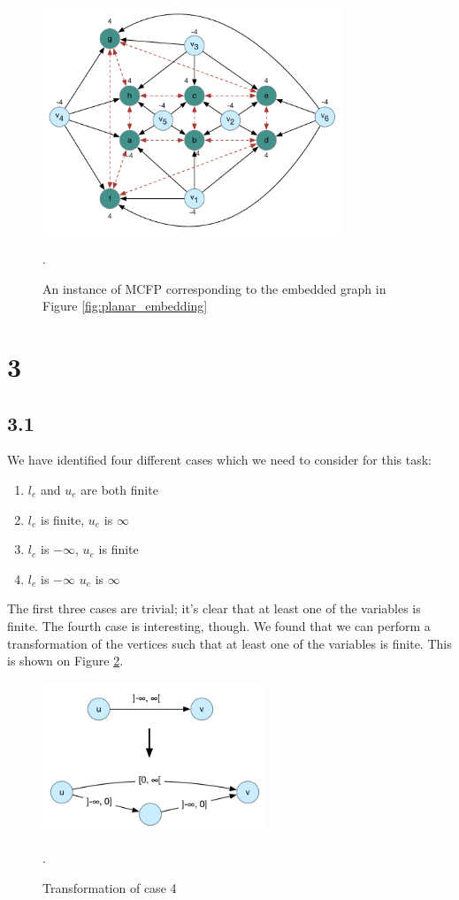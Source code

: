 \documentclass[12pt]{article}
\begin{document}
\begin{figure}[h]
  \centering
    \includegraphics[width=0.8\textwidth]{figures/e2_5}
  \caption{An instance of MCFP corresponding to the embedded graph in Figure \ref{fig:planar_embedding}}.
  \label{fig:mcfp_instance}
\end{figure}

\section{3}
\subsection{3.1}
We have identified four different cases which we need to consider for this task:
\begin{enumerate}
    \item $l_e$ and $u_e$ are both finite
    \item $l_e$ is finite, $u_e$ is $\infty$
    \item $l_e$ is $-\infty$, $u_e$ is finite
    \item $l_e$ is $-\infty$ $u_e$ is $\infty$
\end{enumerate}

The first three cases are trivial; it's clear that at least one of the variables is finite. The fourth case is interesting, though. We found that we can perform a transformation of the vertices such that at least one of the variables is finite. This is shown on Figure \ref{fig:e3_1}.

\begin{figure}[h]
  \centering
    \includegraphics[width=0.6\textwidth]{figures/e3_1}
  \caption{Transformation of case 4}.
    \label{fig:e3_1}
\end{figure}
\end{document}
